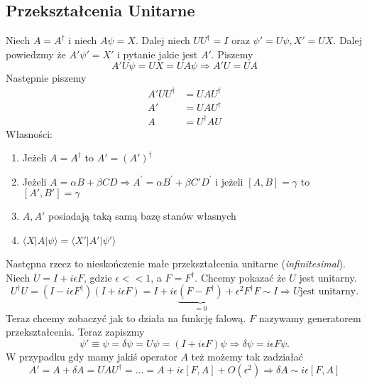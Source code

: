 \subsection{Przekształcenia Unitarne}
Niech $A = A^{\dagger}$ i niech $A \psi = X$. Dalej niech $U U^{\dagger} = I$ oraz $\psi' = U \psi, X' = UX$. Dalej powiedzmy że $A' \psi' = X'$ i pytanie jakie jest $A'$. Piszemy
\begin{equation*}
	A' U \psi = UX = UA\psi \Rightarrow A'U = UA
\end{equation*}
Następnie piszemy
\begin{equation*}
	\begin{split}
		A' U U^{\dagger} &= U A U^{\dagger} \\
		A' &= U A U^{\dagger} \\
		A &= U^{\dagger} A U
	\end{split}
\end{equation*}
Własności:
\begin{enumerate}
	\item Jeżeli $A = A^{\dagger}$ to $A' = (A')^{\dagger}$
	\item Jeżeli $  A=\alpha B+\beta C D \Rightarrow A^{\prime}=\alpha B^{\prime}+\beta C' D^{\prime}  $ i jeżeli $[A, B] = \gamma$ to $[A', B'] = \gamma$
	\item $A, A'$ posiadają taką samą bazę stanów własnych
	\item $\langle X | A | \psi \rangle = \langle X' | A' | \psi' \rangle$ 
\end{enumerate}
Następna rzecz to nieskończenie małe przekształcenia unitarne (\textit{infinitesimal}). Niech $U = I + i \epsilon F$, gdzie $\epsilon << 1$, a $F = F^{\dagger}$. Chcemy pokazać że $U$ jest unitarny.
\begin{equation*}
	U^{\dagger} U = (I - i \epsilon F^{\dagger})(I + i \epsilon F) = I + i \epsilon\underbrace{(F - F^{\dagger})}_{= 0} + \epsilon^2F^{\dagger}F \sim I \Rightarrow U \text{jest unitarny.}
\end{equation*}
Teraz chcemy zobaczyć jak to działa na funkcję falową. $F$ nazywamy generatorem przekształcenia. Teraz zapiszmy $$\psi' \equiv \psi = \delta \psi = U \psi = (I + i \epsilon F)\psi \Rightarrow \delta \psi = i \epsilon F \psi.$$ W przypadku gdy mamy jakiś operator $A$ też możemy tak zadziałać
\begin{equation*}
	A' = A + \delta A = U A U^{\dagger} = \dotsc = A + i \epsilon [F, A] + O(\epsilon^2) \Rightarrow \delta A \sim i \epsilon [F, A]
\end{equation*}
